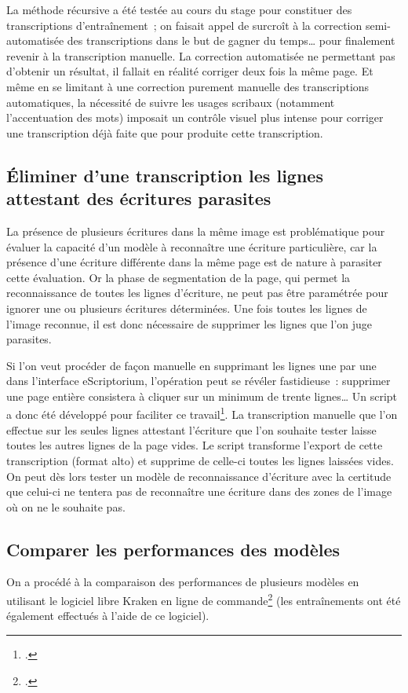 \documentclass[a4paper,12pt,twoside]{book}
\begin{document}
				La méthode récursive a été testée au cours du stage pour constituer des transcriptions d'entraînement~; on faisait appel de surcroît à la correction semi-automatisée des transcriptions dans le but de gagner du temps… pour finalement revenir à la transcription manuelle. La correction automatisée ne permettant pas d'obtenir un résultat, il fallait en réalité corriger deux fois la même page. Et même en se limitant à une correction purement manuelle des transcriptions automatiques, la nécessité de suivre les usages scribaux (notamment l'accentuation des mots) imposait un contrôle visuel plus intense pour corriger une transcription déjà faite que pour produite cette transcription.
			
			\subsection{Éliminer d'une transcription les lignes attestant des écritures parasites}
				La présence de plusieurs écritures dans la même image est problématique pour évaluer la capacité d'un modèle à reconnaître une écriture particulière, car la présence d'une écriture différente dans la même page est de nature à parasiter cette évaluation. Or la phase de \gls{segmentation} de la page, qui permet la reconnaissance de toutes les lignes d'écriture, ne peut pas être paramétrée pour ignorer une ou plusieurs écritures déterminées. Une fois toutes les lignes de l'image reconnue, il est donc nécessaire de supprimer les lignes que l'on juge parasites.
				
				Si l'on veut procéder de façon manuelle en supprimant les lignes une par une dans l'interface eScriptorium, l'opération peut se révéler fastidieuse~: supprimer une page entière consistera à cliquer sur un minimum de trente lignes… Un script a donc été développé pour faciliter ce travail\footcite{biaySupprLignesVidesPy2022}. La transcription manuelle que l'on effectue sur les seules lignes attestant l'écriture que l'on souhaite tester laisse toutes les autres lignes de la page vides. Le script transforme l'export de cette transcription (format \gls{alto}) et supprime de celle-ci toutes les lignes laissées vides. On peut dès lors tester un modèle de reconnaissance d'écriture avec la certitude que celui-ci ne tentera pas de reconnaître une écriture dans des zones de l'image où on ne le souhaite pas.
				
			\subsection{Comparer les performances des modèles}
				On a procédé à la comparaison des performances de plusieurs modèles en utilisant le logiciel libre Kraken en ligne de commande\footcite{KrakenDocumentation} (les entraînements ont été également effectués à l'aide de ce logiciel).
				
\end{document}
